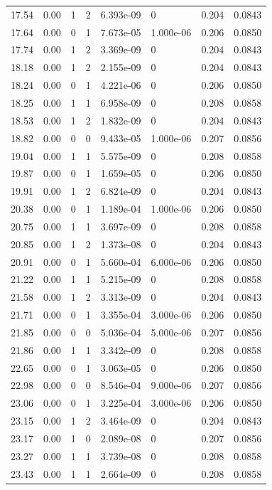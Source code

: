 \documentclass[preview]{standalone}
\begin{document}
{{{\begin{tabular}{L{1.2cm}C{1.2cm} C{0.3cm}C{0.5cm} C{1.4cm}C{1.4cm} C{1.4cm}C{1.4cm}}
  17.54  &  0.00  & 1     &  2 &  6.393e-09  & 0  & 0.204 &  0.0843   \\ 
  17.64  &  0.00  & 0     &  1 &  7.673e-05  & 1.000e-06  & 0.206 &  0.0850   \\ 
  17.74  &  0.00  & 1     &  2 &  3.369e-09  & 0  & 0.204 &  0.0843   \\ 
  18.18  &  0.00  & 1     &  2 &  2.155e-09  & 0  & 0.204 &  0.0843   \\ 
  18.24  &  0.00  & 0     &  1 &  4.221e-06  & 0  & 0.206 &  0.0850   \\ 
  18.25  &  0.00  & 1     &  1 &  6.958e-09  & 0  & 0.208 &  0.0858   \\ 
  18.53  &  0.00  & 1     &  2 &  1.832e-09  & 0  & 0.204 &  0.0843   \\ 
  18.82  &  0.00  & 0     &  0 &  9.433e-05  & 1.000e-06  & 0.207 &  0.0856   \\ 
  19.04  &  0.00  & 1     &  1 &  5.575e-09  & 0  & 0.208 &  0.0858   \\ 
  19.87  &  0.00  & 0     &  1 &  1.659e-05  & 0  & 0.206 &  0.0850   \\ 
  19.91  &  0.00  & 1     &  2 &  6.824e-09  & 0  & 0.204 &  0.0843   \\ 
  20.38  &  0.00  & 0     &  1 &  1.189e-04  & 1.000e-06  & 0.206 &  0.0850   \\ 
  20.75  &  0.00  & 1     &  1 &  3.697e-09  & 0  & 0.208 &  0.0858   \\ 
  20.85  &  0.00  & 1     &  2 &  1.373e-08  & 0  & 0.204 &  0.0843   \\ 
  20.91  &  0.00  & 0     &  1 &  5.660e-04  & 6.000e-06  & 0.206 &  0.0850   \\ 
  21.22  &  0.00  & 1     &  1 &  5.215e-09  & 0  & 0.208 &  0.0858   \\ 
  21.58  &  0.00  & 1     &  2 &  3.313e-09  & 0  & 0.204 &  0.0843   \\ 
  21.71  &  0.00  & 0     &  1 &  3.355e-04  & 3.000e-06  & 0.206 &  0.0850   \\ 
  21.85  &  0.00  & 0     &  0 &  5.036e-04  & 5.000e-06  & 0.207 &  0.0856   \\ 
  21.86  &  0.00  & 1     &  1 &  3.342e-09  & 0  & 0.208 &  0.0858   \\ 
  22.65  &  0.00  & 0     &  1 &  3.063e-05  & 0  & 0.206 &  0.0850   \\ 
  22.98  &  0.00  & 0     &  0 &  8.546e-04  & 9.000e-06  & 0.207 &  0.0856   \\ 
  23.06  &  0.00  & 0     &  1 &  3.225e-04  & 3.000e-06  & 0.206 &  0.0850   \\ 
  23.15  &  0.00  & 1     &  2 &  3.464e-09  & 0  & 0.204 &  0.0843   \\ 
  23.17  &  0.00  & 1     &  0 &  2.089e-08  & 0  & 0.207 &  0.0856   \\ 
  23.27  &  0.00  & 1     &  1 &  3.739e-08  & 0  & 0.208 &  0.0858   \\ 
  23.43  &  0.00  & 1     &  1 &  2.664e-09  & 0  & 0.208 &  0.0858   \\ 
\hline 
\end{tabular} 

}}}
\end{document}
